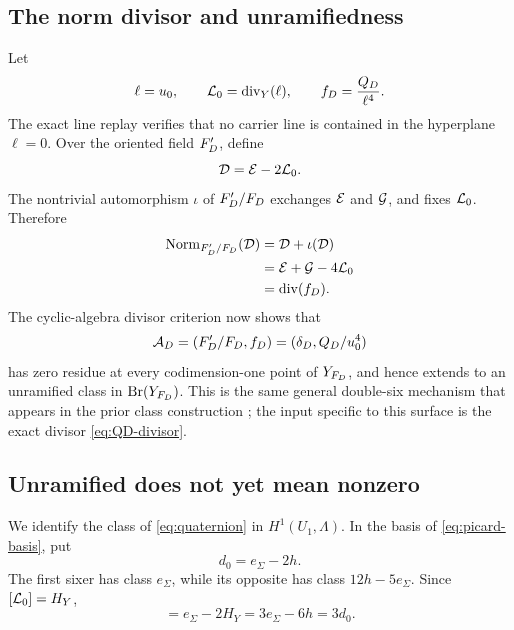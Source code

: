 \subsection{The norm divisor and unramifiedness}

Let
\begin{equation}
 \ell=u_0,\qquad \mathcal L_0=\operatorname{div}_Y(\ell),\qquad
 f_D=\frac{Q_D}{\ell^4}.
\label{eq:fD-def}
\end{equation}
The exact line replay verifies that no carrier line is contained in the
hyperplane \(\ell=0\).  Over the oriented field \(F_D'\), define
\begin{equation}
 \mathcal D=\mathcal E-2\mathcal L_0.
\label{eq:oriented-divisor}
\end{equation}
The nontrivial automorphism \(\iota\) of \(F_D'/F_D\) exchanges \(\mathcal E\) and
\(\mathcal G\), and fixes \(\mathcal L_0\).  Therefore
\begin{align}
 \operatorname{Norm}_{F_D'/F_D}(\mathcal D)
 &=\mathcal D+\iota(\mathcal D)\nonumber\\
 &=\mathcal E+\mathcal G-4\mathcal L_0\nonumber\\
 &=\operatorname{div}(f_D).
\label{eq:norm-divisor}
\end{align}
The cyclic-algebra divisor criterion now shows that
\begin{equation}
 \mathcal A_D=(F_D'/F_D,f_D)
             =(\delta_D,Q_D/u_0^4)
\label{eq:quaternion}
\end{equation}
has zero residue at every codimension-one point of \(Y_{F_D}\), and hence
extends to an unramified class in \(\operatorname{Br}(Y_{F_D})\).  This is the same general
double-six mechanism that appears in the prior class construction
\cite{ElsenhansJahnel2010Brauer}; the input specific to this surface is the
exact divisor \cref{eq:QD-divisor}.

\subsection{Unramified does not yet mean nonzero}

We identify the class of \cref{eq:quaternion} in
\(H^1(U_1,\Lambda)\).  In the basis of \cref{eq:picard-basis}, put
\begin{equation}
 d_0=e_\Sigma-2h.
\label{eq:d0-def}
\end{equation}
The first sixer has class \(e_\Sigma\), while its opposite has class
\(12h-5e_\Sigma\).  Since \([\mathcal L_0]=H_Y\),
\begin{equation}
 [\cD]=e_\Sigma-2H_Y
       =3e_\Sigma-6h
       =3d_0.
\label{eq:D-class}
\end{equation}

